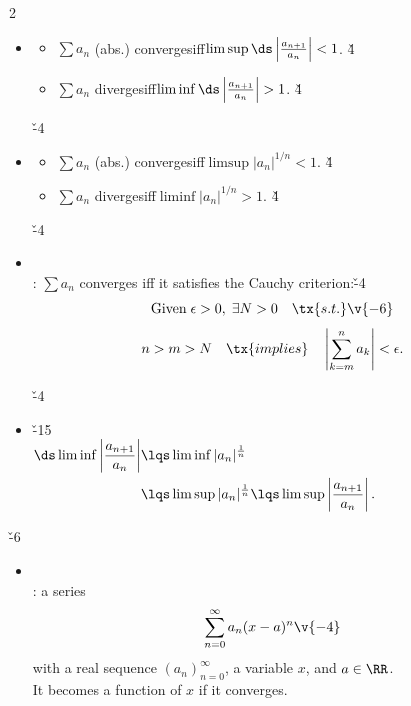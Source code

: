 \documentclass[dvipdfmx,a4paper,titlepage,9pt]{jsarticle}
\begin{document}
\begin{multicols*}{2}
\begin{itemize}[label={-}]
\;\v{-4}

\item{}
\begin{itemize}[label={$\cdot$}]
\setlength{\leftskip}{-10pt}
\item $\sum a_n$ (abs.) converges\quad iff\quad $\limsup\ds\left|\frac{a_{n+1}}{a_n}\right|<1$. \v4
\item $\sum a_n$ diverges\quad iff\quad $\liminf\ds\left|\frac{a_{n+1}}{a_n}\right|>1$. \v4
\end{itemize}

\;\v{-4}

\item{}
\begin{itemize}[label={$\cdot$}]
\setlength{\leftskip}{-10pt}
\item $\sum a_n$ (abs.) converges\quad iff\quad $\limsup{}|a_n|^{1/n}<1$. \v4
\item $\sum a_n$ diverges\quad iff\quad $\liminf|a_n|^{1/n}>1$. \v4
\end{itemize}

\;\v{-4}

\item{} \\
: $\sum a_n$ converges iff it satisfies the Cauchy criterion:\v{-4}
$$\text{Given}\;\epsilon>0,\;\exists N>0\quad\tx{s.t.}\v{-6}$$
$$n>m>N\quad\tx{implies}\quad\left|\sum_{k=m}^na_k\right|<\epsilon.$$

\; \v{-4}

\item\; \v{-15}\\
$\begin{aligned}\ds\liminf\left|\frac{a_{n+1}}{a_n}\right|&\lqs\liminf|a_n|^{\frac1n}\\&\lqs\limsup|a_n|^{\frac1n}\lqs\limsup\left|\frac{a_{n+1}}{a_n}\right|.\end{aligned}$
\end{itemize}

\vfill\null\columnbreak


\v{-6}
\begin{itemize}[label={-}]
\item {} \\
: a series
$$\sum_{n=0}^\infty a_n(x-a)^n\v{-4}$$
\;\;with a real sequence $(a_n)_{n=0}^\infty$, a variable $x$, and $a\in\RR$. \\
\;\;It becomes a function of $x$ if it converges. \\
\end{itemize}


\end{multicols*}
\end{document}
